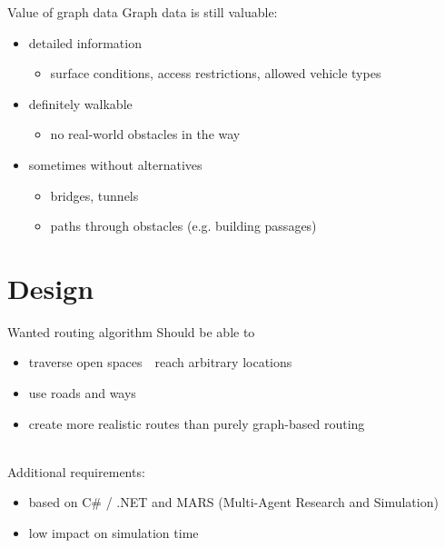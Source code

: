 \documentclass[xcolor={x11names}]{beamer}
\renewcommand{\n}{\hfill\\[0.5ex]}
\newcommand{\nn}{\hfill\\[2ex]}
\begin{document}
		\begin{frame}{Value of graph data}
			Graph data is still valuable:\n
			\begin{itemize}
				\item detailed information
				\begin{itemize}
					\item surface conditions, access restrictions, allowed vehicle types
				\end{itemize}
				\item definitely walkable
				\begin{itemize}
					\item no real-world obstacles in the way
				\end{itemize}
				\item sometimes without alternatives
				\begin{itemize}
					\item bridges, tunnels
					\item paths through obstacles (e.g. building passages)
				\end{itemize}
			\end{itemize}
		\end{frame}
	
	\section{Design}
	
		\begin{frame}{Wanted routing algorithm}
			Should be able to\n
			\begin{itemize}
				\item traverse open spaces\ \textrightarrow\ reach arbitrary locations
				\item use roads and ways
				\item create more realistic routes than purely graph-based routing
			\end{itemize}
			\nn
			\pause
			Additional requirements:\n
			\begin{itemize}
				\item based on C\# / .NET and MARS (Multi-Agent Research and Simulation)
				\item low impact on simulation time
			\end{itemize}
		\end{frame}
		
\end{document}
